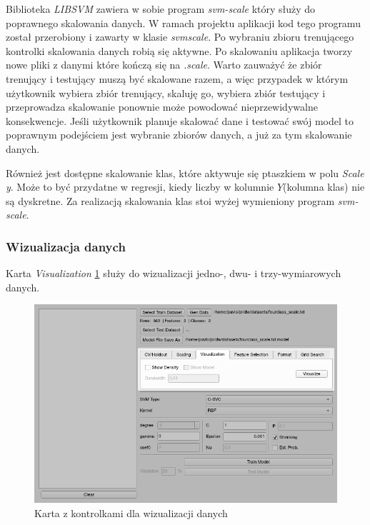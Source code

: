 \documentclass[paper=a4, fontsize=11pt]{scrartcl} %
\numberwithin{equation}{section} %
\numberwithin{figure}{section} %
\begin{document}
    \par Biblioteka \textit{LIBSVM} zawiera w sobie program \textit{svm-scale} który służy do
    poprawnego skalowania danych. W ramach projektu aplikacji kod tego programu został
    przerobiony i zawarty w klasie \textit{svmscale}. Po wybraniu zbioru trenującego kontrolki
    skalowania danych robią się aktywne. Po skalowaniu aplikacja tworzy nowe pliki z danymi
    które kończą się na \textit{.scale}. Warto zauważyć że zbiór trenujący i testujący muszą
    być skalowane razem, a więc przypadek w którym użytkownik wybiera zbiór trenujący, skaluję
    go, wybiera zbiór testujący i przeprowadza skalowanie ponownie może powodować
    nieprzewidywalne konsekwencje. Jeśli użytkownik planuje skalować dane i testować swój model
    to poprawnym podejściem jest wybranie zbiorów danych, a już za tym skalowanie danych.

    \par Również jest dostępne skalowanie klas, które aktywuje się ptaszkiem w polu
    \textit{Scale y}. Może to być przydatne w regresji, kiedy liczby w kolumnie $Y$(kolumna
    klas) nie są dyskretne. Za realizacją skalowania klas stoi wyżej wymieniony program
    \textit{svm-scale}.

\newpage
\subsubsection{Wizualizacja danych}
    \par Karta \textit{Visualization} \ref{fig:visualization} służy do wizualizacji jedno-,
    dwu- i trzy-wymiarowych danych. 

    \begin{figure}[H]
        \begin{center}
            \includegraphics[scale=0.65]{./img/svm_app_visualization.png}
            \caption{Karta z kontrolkami dla wizualizacji danych}
            \label{fig:visualization}
        \end{center}
    \end{figure}
\end{document}
